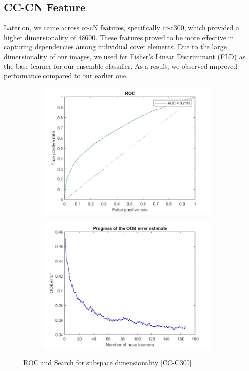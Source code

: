 \subsection{CC-CN Feature}
Later on, we came across cc-cN features, specifically cc-c300, which provided a higher dimensionality of 48600. These features proved to be more effective in capturing dependencies among individual cover elements. Due to the large dimensionality of our images, we used for Fisher's Linear Discriminant (FLD) as the base learner for our ensemble classifier. As a result, we observed improved performance compared to our earlier one.\\
\begin{figure}[H]
    \begin{subfigure}[b]{0.5\textwidth}
        \includegraphics[width=\textwidth]{img/ROC300.jpg}
    \end{subfigure}
    \hfill
    \begin{subfigure}[b]{0.5\textwidth}
        \includegraphics[width=\textwidth]{img/saturation300.jpg}
    \end{subfigure}
    \caption{ROC and Search for subspace dimensionality [CC-C300]}
\end{figure}
